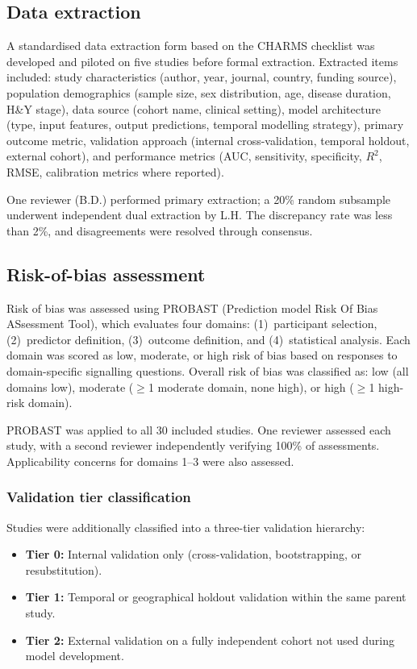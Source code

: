 \documentclass[11pt,a4paper]{article}
\begin{document}
\subsection{Data extraction}

A standardised data extraction form based on the CHARMS checklist\cite{moons2014} was developed and piloted on five studies before formal extraction. Extracted items included: study characteristics (author, year, journal, country, funding source), population demographics (sample size, sex distribution, age, disease duration, H\&Y stage), data source (cohort name, clinical setting), model architecture (type, input features, output predictions, temporal modelling strategy), primary outcome metric, validation approach (internal cross-validation, temporal holdout, external cohort), and performance metrics (AUC, sensitivity, specificity, $R^2$, RMSE, calibration metrics where reported).

One reviewer (B.D.) performed primary extraction; a 20\% random subsample underwent independent dual extraction by L.H. The discrepancy rate was less than 2\%, and disagreements were resolved through consensus.

\subsection{Risk-of-bias assessment}

Risk of bias was assessed using PROBAST (Prediction model Risk Of Bias ASsessment Tool)\cite{wolff2019}, which evaluates four domains: (1)~participant selection, (2)~predictor definition, (3)~outcome definition, and (4)~statistical analysis. Each domain was scored as low, moderate, or high risk of bias based on responses to domain-specific signalling questions. Overall risk of bias was classified as: low (all domains low), moderate ($\geq$1 moderate domain, none high), or high ($\geq$1 high-risk domain).

PROBAST was applied to all 30 included studies. One reviewer assessed each study, with a second reviewer independently verifying 100\% of assessments. Applicability concerns for domains 1--3 were also assessed.

\subsubsection{Validation tier classification}

Studies were additionally classified into a three-tier validation hierarchy:
\begin{itemize}[leftmargin=*]
    \item \textbf{Tier 0:} Internal validation only (cross-validation, bootstrapping, or resubstitution).
    \item \textbf{Tier 1:} Temporal or geographical holdout validation within the same parent study.
    \item \textbf{Tier 2:} External validation on a fully independent cohort not used during model development.
\end{itemize}
\end{document}
